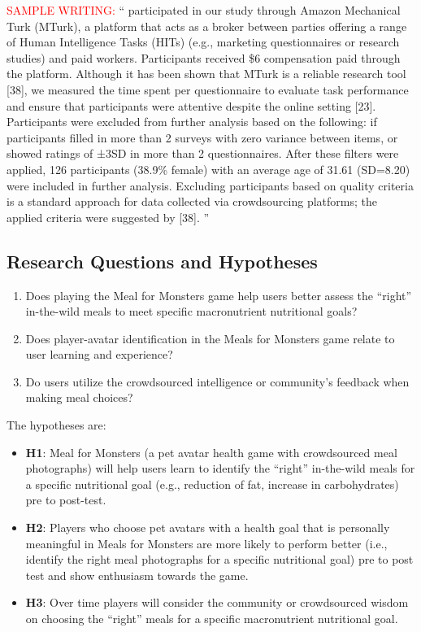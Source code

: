 \textcolor{red}{SAMPLE WRITING:} `` participated in our study through Amazon Mechanical Turk (MTurk), a platform that acts as a broker
between parties offering a range of Human Intelligence
Tasks (HITs) (e.g., marketing questionnaires or research
studies) and paid workers. Participants received \$6 compensation paid through the platform. Although it has been
shown that MTurk is a reliable research tool [38], we measured the time spent per questionnaire to evaluate task performance and ensure that participants were attentive despite
the online setting [23]. Participants were excluded from
further analysis based on the following: if participants filled
in more than 2 surveys with zero variance between items, or
showed ratings of ±3SD in more than 2 questionnaires. After these filters were applied, 126 participants (38.9\% female) with an average age of 31.61 (SD=8.20) were included in further analysis. Excluding participants based on quality criteria is a standard approach for data collected via
crowdsourcing platforms; the applied criteria were suggested by [38]. ''


\subsection{Research Questions and Hypotheses}

\begin{enumerate}
    \item Does playing the Meal for Monsters game help users better assess the ``right'' in-the-wild meals to meet specific macronutrient nutritional goals?
    \item Does player-avatar identification in the Meals for Monsters game relate to user learning and experience?
    \item Do users utilize the crowdsourced intelligence or community's feedback when making meal choices?
\end{enumerate}

The hypotheses are:
\begin{itemize}
    \item \textbf{H1}: Meal for Monsters (a pet avatar health game with crowdsourced meal photographs) will help users learn to identify the ``right'' in-the-wild meals for a specific nutritional goal (e.g., reduction of fat, increase in carbohydrates) pre to post-test.
    \item \textbf{H2}: Players who choose pet avatars with a health goal that is personally meaningful in Meals for Monsters are more likely to perform better (i.e., identify the right meal photographs for a specific nutritional goal) pre to post test and show enthusiasm towards the game. 
    \item \textbf{H3}: Over time players will consider the community or crowdsourced wisdom on choosing the ``right'' meals for a specific macronutrient nutritional goal.

\end{itemize}

